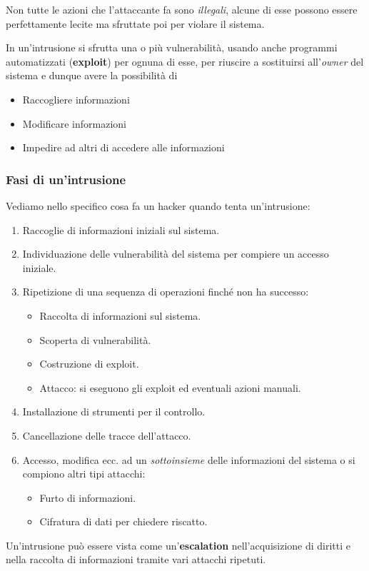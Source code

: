 Non tutte le azioni che l'attaccante fa sono \emph{illegali}, alcune di esse possono essere perfettamente lecite ma
sfruttate poi per violare il sistema.

In un'intrusione si sfrutta una o più vulnerabilità, usando anche programmi automatizzati (\textbf{exploit}) per ognuna
di esse, per riuscire a sostituirsi all'\emph{owner} del sistema e dunque avere la possibilità di
\begin{itemize}
	\item Raccogliere informazioni
	\item Modificare informazioni
	\item Impedire ad altri di accedere alle informazioni
\end{itemize}

\subsubsection{Fasi di un'intrusione}
Vediamo nello specifico cosa fa un hacker quando tenta un'intrusione:
\begin{enumerate}
	\item Raccoglie di informazioni iniziali sul sistema.
	\item Individuazione delle vulnerabilità del sistema per compiere un accesso iniziale.
	\item Ripetizione di una sequenza di operazioni finché non ha successo:
	      \begin{itemize}
		      \item Raccolta di informazioni sul sistema.
		      \item Scoperta di vulnerabilità.
		      \item Costruzione di exploit.
		      \item Attacco: si eseguono gli exploit ed eventuali azioni manuali.
	      \end{itemize}
	\item Installazione di strumenti per il controllo.
	\item Cancellazione delle tracce dell'attacco.
	\item Accesso, modifica ecc. ad un \emph{sottoinsieme} delle informazioni del sistema o si compiono altri
	      tipi attacchi:
	      \begin{itemize}
		      \item Furto di informazioni.
		      \item Cifratura di dati per chiedere riscatto.
	      \end{itemize}
\end{enumerate}
Un'intrusione può essere vista come un'\textbf{escalation} nell'acquisizione di diritti e nella raccolta di
informazioni tramite vari attacchi ripetuti.

